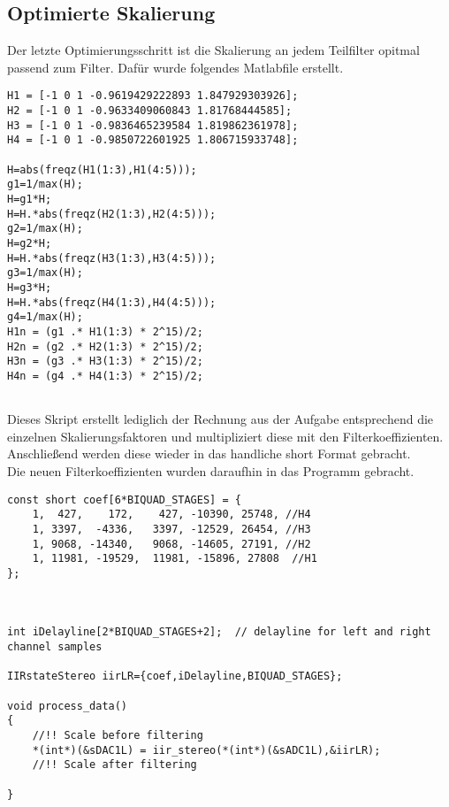 \subsection{Optimierte Skalierung}
Der letzte Optimierungsschritt ist die Skalierung an jedem Teilfilter opitmal passend zum Filter.
Dafür wurde folgendes Matlabfile erstellt.\\
\begin{adjustbox}{width=\textwidth,height=\textheight,keepaspectratio}
 \begin{lstlisting}[title=optimierung.m]
H1 = [-1 0 1 -0.9619429222893 1.847929303926];
H2 = [-1 0 1 -0.9633409060843 1.81768444585];
H3 = [-1 0 1 -0.9836465239584 1.819862361978];
H4 = [-1 0 1 -0.9850722601925 1.806715933748];

H=abs(freqz(H1(1:3),H1(4:5)));
g1=1/max(H);
H=g1*H;
H=H.*abs(freqz(H2(1:3),H2(4:5)));
g2=1/max(H);
H=g2*H;
H=H.*abs(freqz(H3(1:3),H3(4:5)));
g3=1/max(H);
H=g3*H;
H=H.*abs(freqz(H4(1:3),H4(4:5)));
g4=1/max(H);
H1n = (g1 .* H1(1:3) * 2^15)/2;
H2n = (g2 .* H2(1:3) * 2^15)/2;
H3n = (g3 .* H3(1:3) * 2^15)/2;
H4n = (g4 .* H4(1:3) * 2^15)/2;


\end{lstlisting}
\end{adjustbox}
Dieses Skript erstellt lediglich der Rechnung aus der Aufgabe entsprechend die einzelnen Skalierungsfaktoren und multipliziert diese mit den Filterkoeffizienten. Anschließend werden diese wieder in das handliche short Format gebracht.\\
Die neuen Filterkoeffizienten wurden daraufhin in das Programm gebracht.\\
\begin{adjustbox}{width=\textwidth,height=\textheight,keepaspectratio}
 \begin{lstlisting}[title=processdata.c]
const short coef[6*BIQUAD_STAGES] = {
	1,  427,    172,    427, -10390, 25748, //H4
	1, 3397,  -4336,   3397, -12529, 26454, //H3
	1, 9068, -14340,   9068, -14605, 27191, //H2
	1, 11981, -19529,  11981, -15896, 27808  //H1
};



int iDelayline[2*BIQUAD_STAGES+2];	// delayline for left and right channel samples

IIRstateStereo iirLR={coef,iDelayline,BIQUAD_STAGES};

void process_data()
{
	//!! Scale before filtering
	*(int*)(&sDAC1L) = iir_stereo(*(int*)(&sADC1L),&iirLR);
	//!! Scale after filtering

}
\end{lstlisting}
\end{adjustbox}
